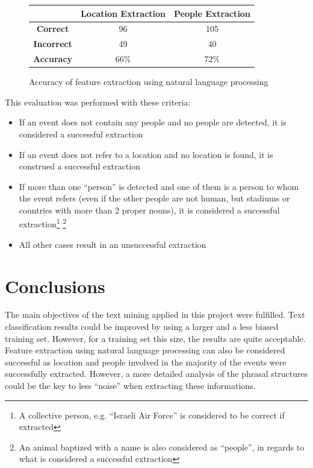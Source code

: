 \documentclass{llncs}
\begin{document}
\begin{figure}[h!]
	\centering
	\begin{tabular}{c|c|c}
		& \textbf{Location Extraction} & \textbf{People Extraction} \\
		\hline
		\textbf{Correct}   & 96 & 105 \\
		\textbf{Incorrect} & 49 & 40 \\
		\hline
		\textbf{Accuracy}  & 66\% & 72\% \\ 
	\end{tabular}
	\caption{Accuracy of feature extraction using natural language processing}
	\label{fig:feature-extraction-accuracy}
\end{figure}

This evaluation was performed with these criteria:

\begin{itemize}
	\item If an event does not contain any people and no people are detected, it is considered a successful extraction
	\item If an event does not refer to a location and no location is found, it is construed a successful extraction
	\item If more than one ``person'' is detected and one of them is a person to whom the event refers (even if the other people are not human, but stadiums or countries with more than 2 proper nouns), it is considered a successful extraction\footnote{A collective person, e.g. ``Israeli Air Force'' is considered to be correct if extracted} \footnote{An animal baptized with a name is also considered as ``people'', in regards to what is considered a successful extraction}
	\item All other cases result in an unsuccessful extraction
\end{itemize}

\section{Conclusions}

The main objectives of the text mining applied in this project were fulfilled. Text classification results could be improved by using a larger and a less biased training set. However, for a training set this size, the results are quite acceptable. Feature extraction using natural language processing can also be considered successful as location and people involved in the majority of the events were successfully extracted. However, a more detailed analysis of the phrasal structures could be the key to less ``noise'' when extracting these informations.
\end{document}
